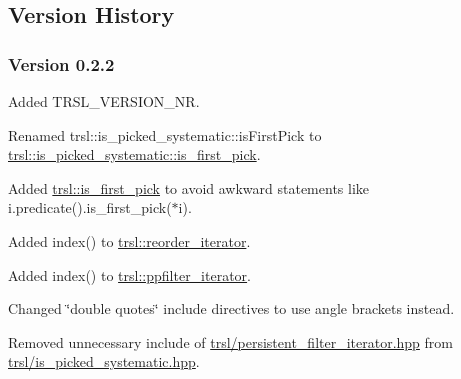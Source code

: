 \hypertarget{group__version__history}{
\subsection{Version History}
\label{group__version__history}
}
\hypertarget{group__version__history_version_history_v022}{}\subsubsection{Version 0.2.2}\label{group__version__history_version_history_v022}

\begin{DoxyItemize}
\item Added TRSL\_\-VERSION\_\-NR.
\end{DoxyItemize}


\begin{DoxyItemize}
\item Renamed trsl::is\_\-picked\_\-systematic::isFirstPick to \hyperlink{classtrsl_1_1is__picked__systematic_a47828e07ba7bc503b503e069e145d68a}{trsl::is\_\-picked\_\-systematic::is\_\-first\_\-pick}.
\end{DoxyItemize}


\begin{DoxyItemize}
\item Added \hyperlink{namespacetrsl_a412db7961cfc65236d71610635038225}{trsl::is\_\-first\_\-pick} to avoid awkward statements like {\ttfamily i.predicate().is\_\-first\_\-pick($\ast$i)}.
\end{DoxyItemize}


\begin{DoxyItemize}
\item Added {\ttfamily index()} to \hyperlink{classtrsl_1_1reorder__iterator}{trsl::reorder\_\-iterator}.
\end{DoxyItemize}


\begin{DoxyItemize}
\item Added {\ttfamily index()} to \hyperlink{classtrsl_1_1ppfilter__iterator}{trsl::ppfilter\_\-iterator}.
\end{DoxyItemize}


\begin{DoxyItemize}
\item Changed \char`\"{}double quotes\char`\"{} include directives to use angle brackets instead.
\end{DoxyItemize}


\begin{DoxyItemize}
\item Removed unnecessary include of \hyperlink{persistent__filter__iterator_8hpp}{trsl/persistent\_\-filter\_\-iterator.hpp} from \hyperlink{is__picked__systematic_8hpp}{trsl/is\_\-picked\_\-systematic.hpp}.
\end{DoxyItemize}


